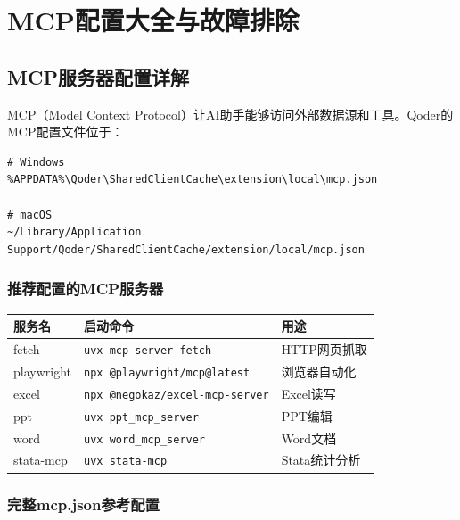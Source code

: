
\chapter{MCP配置大全与故障排除}

\section{MCP服务器配置详解}

MCP（Model Context Protocol）让AI助手能够访问外部数据源和工具。Qoder的MCP配置文件位于：

\begin{lstlisting}
# Windows
%APPDATA%\Qoder\SharedClientCache\extension\local\mcp.json

# macOS
~/Library/Application Support/Qoder/SharedClientCache/extension/local/mcp.json
\end{lstlisting}

\subsection{推荐配置的MCP服务器}

\begin{table}[H]
\centering
\begin{tabular}{lll}
\toprule
\textbf{服务名} & \textbf{启动命令} & \textbf{用途} \\
\midrule
fetch & \texttt{uvx mcp-server-fetch} & HTTP网页抓取 \\
playwright & \texttt{npx @playwright/mcp@latest} & 浏览器自动化 \\
excel & \texttt{npx @negokaz/excel-mcp-server} & Excel读写 \\
ppt & \texttt{uvx ppt\_mcp\_server} & PPT编辑 \\
word & \texttt{uvx word\_mcp\_server} & Word文档 \\
stata-mcp & \texttt{uvx stata-mcp} & Stata统计分析 \\
\bottomrule
\end{tabular}
\end{table}

\subsection{完整mcp.json参考配置}


